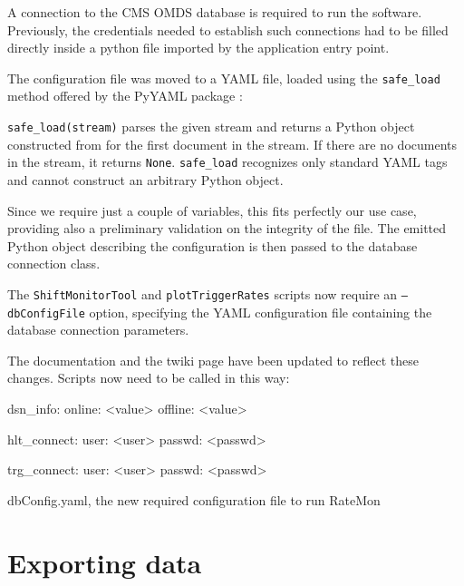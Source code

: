 A connection to the CMS OMDS database is required to run the software. Previously, the credentials needed to establish such connections had to be filled directly inside a python file imported by the application entry point.

The configuration file was moved to a YAML file, loaded using the \texttt{safe\_load} method offered by the PyYAML package \cite{pyyaml-2020-06-18}:

\texttt{safe\_load(stream)} parses the given stream and returns a Python object constructed from for the first document in the stream. If there are no documents in the stream, it returns \texttt{None}. \texttt{safe\_load} recognizes only standard YAML tags and cannot construct an arbitrary Python object.

Since we require just a couple of variables, this fits perfectly our use case, providing also a preliminary validation on the integrity of the file. The emitted Python object describing the configuration is then passed to the database connection class.

The \texttt{ShiftMonitorTool} and \texttt{plotTriggerRates} scripts now require an \texttt{--dbConfigFile} option, specifying the YAML configuration file containing the database connection parameters.

The documentation and the twiki page have been updated to reflect these changes. Scripts now need to be called in this way:


\begin{listing}[ht]
\begin{yamlcode}
dsn_info:
    online: <value>
    offline: <value>

hlt_connect:
    user: <user>
    passwd: <passwd>

trg_connect:
    user: <user>
    passwd: <passwd>
\end{yamlcode}
\caption{dbConfig.yaml, the new required configuration file to run RateMon}
\end{listing}

\section{Exporting data}

